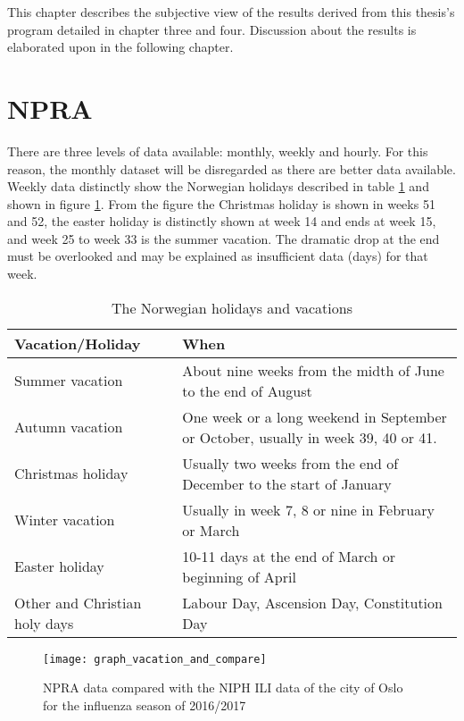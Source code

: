 This chapter describes the subjective view of the results derived from this thesis's program detailed in chapter three and four. Discussion about the results is elaborated upon in the following chapter.



\section{NPRA}
There are three levels of data available: monthly, weekly and hourly. For this reason, the monthly dataset will be disregarded as there are better data available. Weekly data distinctly show the Norwegian holidays described in table \ref{table:jesus} and shown in figure \ref{fig:graph_vacation_and_compare}. From the figure the Christmas holiday is shown in weeks 51 and 52, the easter holiday is distinctly shown at week 14 and ends at week 15, and week 25 to week 33 is the summer vacation. The dramatic drop at the end must be overlooked and may be explained as insufficient data (days) for that week. 

\begin{center}
\begin{table}[!h]
\begin{tabular}{ | m{9em} | m{10cm}| }
 \hline
 \textbf{Vacation/Holiday} & \textbf{When} \\ [0.5ex] 
 \hline
 Summer vacation & About nine weeks from the midth of June to the end of August  \\ 
 \hline 
 Autumn vacation & One week or a long weekend in September or October, usually in week 39, 40 or 41.\\ 
 \hline
 Christmas holiday & Usually two weeks from the end of December to the start of January\\ 
 \hline
 Winter vacation & Usually in week 7, 8 or nine in February or March \\ 
  \hline
 Easter holiday & 10-11 days at the end of March or beginning of April \\ 
  \hline
 Other and Christian holy days & Labour Day, Ascension Day, Constitution Day \\ 
  \hline
\end{tabular}
\caption{The Norwegian holidays and vacations}
 \label{table:jesus}
\end{table}
\end{center}

\begin{figure}[!htb]
\texttt{[image: graph\_vacation\_and\_compare]}
\centering
\caption{NPRA data compared with the NIPH ILI data of the city of Oslo for the influenza season of 2016/2017}
\label{fig:graph_vacation_and_compare}
\end{figure}

